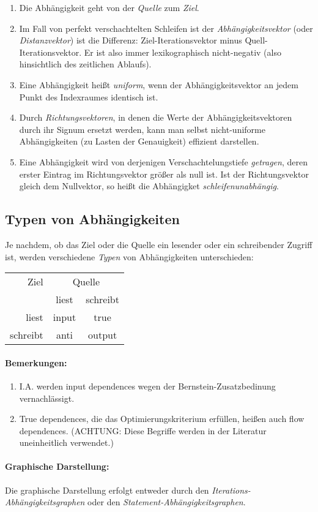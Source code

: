 \begin{enumerate}
\item Die Abhängigkeit geht von der \emph{Quelle} zum \emph{Ziel}.
\item Im Fall von perfekt verschachtelten Schleifen ist der
  \emph{Abhängigkeitsvektor} (oder \emph{Distanzvektor}) ist die Differenz: Ziel-Iterationsvektor minus
  Quell-Iterationsvektor. Er ist also immer lexikographisch nicht-negativ (also hinsichtlich des zeitlichen Ablaufs).
\item Eine Abhängigkeit heißt \emph{uniform}, wenn der Abhängigkeitsvektor an
  jedem Punkt des Indexraumes identisch ist.
\item Durch \emph{Richtungsvektoren}, in denen die Werte der
  Abhängigkeitsvektoren durch ihr Signum ersetzt werden, kann man selbst
  nicht-uniforme Abhängigkeiten (zu Lasten der Genauigkeit) effizient
  darstellen. 
\item Eine Abhängigkeit wird von derjenigen Verschachtelungstiefe
  \emph{getragen}, deren erster Eintrag im Richtungsvektor größer als
  null ist. Ist der Richtungsvektor gleich dem Nullvektor, so heißt die
  Abhängigket \emph{schleifenunabhängig}.
\end{enumerate}

\subsection{Typen von Abhängigkeiten}

Je nachdem, ob das Ziel oder die Quelle ein lesender oder ein
schreibender Zugriff ist, werden verschiedene \emph{Typen} von
Abhängigkeiten unterschieden: 

\smallskip

\begin{center}
\begin{tabular}{||r|cc||}
\hline
Ziel & \multicolumn{2}{|c||}{Quelle}\\
 & liest & schreibt \\
\hline
liest & input & true\\
schreibt & anti & output\\
\hline
\end{tabular}
\end{center}

\paragraph{Bemerkungen:} 

\begin{enumerate}
\item I.A. werden input dependences wegen der Bernstein-Zusatzbedinung
  vernachlässigt.
\item True dependences, die das Optimierungskriterium erfüllen, heißen
  auch flow dependences. (ACHTUNG: Diese Begriffe werden in der Literatur
  uneinheitlich verwendet.)
\end{enumerate}

\paragraph{Graphische Darstellung:}

Die graphische Darstellung erfolgt entweder durch den
\emph{Iterations-Abhängigkeitsgraphen} oder den
\emph{Statement-Abhängigkeitsgraphen}.
